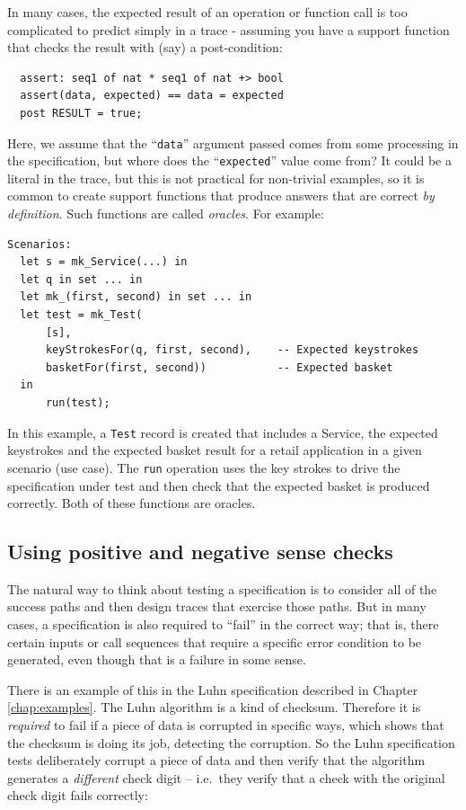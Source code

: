 \documentclass{overturerepchap}
\begin{document}
In many cases, the expected result of an operation or function call is too
complicated to predict simply in a trace - assuming you have a support function
that checks the result with (say) a post-condition:

\scriptsize
\begin{lstlisting}
  assert: seq1 of nat * seq1 of nat +> bool
  assert(data, expected) == data = expected
  post RESULT = true;
\end{lstlisting}
\normalsize

Here, we assume that the ``\texttt{data}'' argument passed comes from some processing in
the specification, but where does the ``\texttt{expected}'' value come from? It could be
a literal in the trace, but this is not practical for non-trivial examples, so
it is common to create support functions that produce answers that are correct
\emph{by definition}. Such functions are called \emph{oracles}. For example:

\scriptsize
\begin{lstlisting}
Scenarios:
  let s = mk_Service(...) in
  let q in set ... in
  let mk_(first, second) in set ... in 
  let test = mk_Test(
      [s],
      keyStrokesFor(q, first, second),    -- Expected keystrokes
      basketFor(first, second))           -- Expected basket
  in
      run(test);
\end{lstlisting}
\normalsize

In this example, a \texttt{Test} record is created that includes a Service, the
expected keystrokes and the expected basket result for a retail application in
a given scenario (use case). The \texttt{run} operation uses the key strokes to
drive the specification under test and then check that the expected basket is
produced correctly. Both of these functions are oracles.

\subsection{Using positive and negative sense checks}

The natural way to think about testing a specification is to consider all of the
success paths and then design traces that exercise those paths. But in many
cases, a specification is also required to ``fail'' in the correct way; that is,
there certain inputs or call sequences that require a specific error condition
to be generated, even though that is a failure in some sense.

There is an example of this in the Luhn specification described in Chapter
\ref{chap:examples}. The Luhn algorithm is a kind of checksum. Therefore it is
\emph{required} to fail if a piece of data is corrupted in specific ways, which
shows that the checksum is doing its job, detecting the corruption. So the Luhn
specification tests deliberately corrupt a piece of data and then verify that
the algorithm generates a \emph{different} check digit -- i.e.\ they verify that a
check with the original check digit fails correctly:
\end{document}
